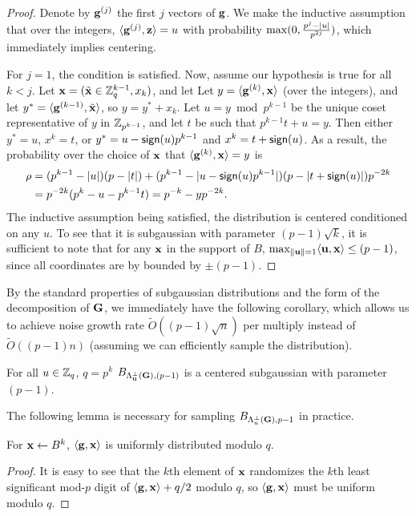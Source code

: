 \begin{proof}
Denote by $\mathbf{g}^{(j)}$ the first $j$ vectors of $\mathbf{g}$. 
We make the inductive
assumption that over the integers,
$\langle\mathbf{g}^{(j)},\mathbf{z}\rangle=u$ with probability
$\max(0,\tfrac{p^j-\lvert u\rvert}{p^{2j}})$, which immediately
implies centering.

For $j=1$, the condition is satisfied.
Now, assume our hypothesis is true for all $k < j$.
Let $\mathbf{x}=(\tilde{\mathbf{x}} \in \mathbb{Z}_q^{k-1}, x_k)$, and let 
Let $y=\langle\mathbf{g}^{(k)},\mathbf{x}\rangle$ (over the integers), and let 
$y^*=\langle\mathbf{g}^{(k-1)},\tilde{\mathbf{x}}\rangle$, so $y=y^*+x_k$. 
Let $u=y \bmod{p^{k-1}}$ be the unique coset representative of $y$ in
$\mathbb{Z}_{p^{k-1}}$, and let $t$ be such that $p^{k-1}t+u=y$. 
Then either $y^*=u$, $x^k=t$, or $y^*=u-\textsf{sign}(u)p^{k-1}$ and
$x^k=t+\textsf{sign}(u)$. 
As a result, the probability over the choice of $\mathbf{x}$ that
$\langle\mathbf{g}^{(k)},\mathbf{x}\rangle=y$ is
\begin{align*}
\rho&=(p^{k-1}-\lvert u\rvert)(p-\lvert t\rvert)+(p^{k-1}-\lvert u-\textsf{sign}(u)p^{k-1}\rvert)(p-\lvert t+\textsf{sign}(u)\rvert)p^{-2k}\\
&=p^{-2k}(p^k-u-p^{k-1}t)=p^{-k}-yp^{-2k}.
\end{align*}
The inductive assumption being satisfied, the distribution is centered conditioned on any $u$. 
To see that it is subgaussian with parameter $(p-1)\sqrt{k}$, it is
sufficient to note that for any $\mathbf{x}$ in the support of $B$, $\max_{\lVert\mathbf{u}\rVert=1}\langle\mathbf{u},\mathbf{x}\rangle
\leq (p-1)$, since all coordinates are by bounded by $\pm (p-1)$.
\end{proof}

By the standard properties of subgaussian distributions and the form
of the decomposition of $\mathbf{G}$, we immediately have the following corollary, which allows us to
achieve noise growth rate $\tilde{O}((p-1)\sqrt{n})$ per multiply instead
of $\tilde{O}((p-1)n)$ (assuming we can efficiently sample the distribution).
\begin{corollary}\label{cor:sampleGsub}
For all $u \in \mathbb{Z}_q$, $q=p^{k}$
$B_{\Lambda^{\perp}_{\mathbf{u}}(\mathbf{G}),(p-1)}$ is a centered subgaussian with parameter
$(p-1)$.
\end{corollary}


The following lemma is necessary for sampling $B_{\Lambda^{\perp}_{u}(\mathbf{G}),p-1}$ in
practice.

\begin{lemma}\label{lem:uniformity}
For $\mathbf{x} \gets B^k$, $\langle\mathbf{g},\mathbf{x}\rangle$ is uniformly distributed
modulo $q$.  
\end{lemma}
\begin{proof}
It is easy to see that the $k$th element of $\mathbf{x}$ randomizes the $k$th
least significant mod-$p$ digit of $\langle\mathbf{g},\mathbf{x}\rangle+q/2$ modulo $q$, so
$\langle\mathbf{g},\mathbf{x}\rangle$ must be uniform modulo $q$. 
\end{proof}

